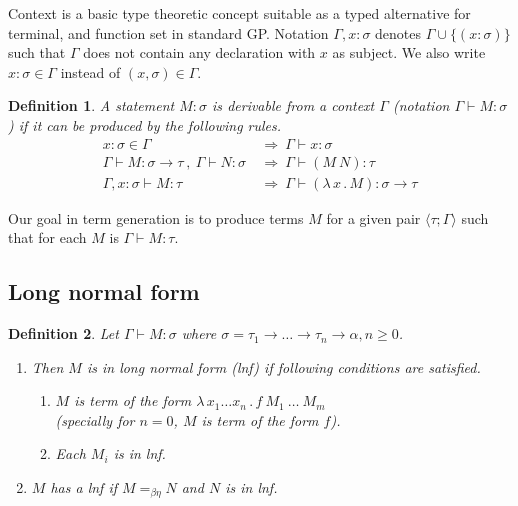 \documentclass{sig-alternate}
\newtheorem{definition}{Definition}
\newcommand{\tur}[3]{#1\vdash{}#2 \colon #3}
\newcommand{\turst}[3]{$#1\vdash{}#2:#3$\xspace}
\newcommand{\GMS}{\turst{\Gamma}{M}{\sigma}}
\newcommand{\then}{\Rightarrow\xspace}
\newcommand{\lamb}[2]{( \lambda \, #1 \, . \, #2 )}
\newcommand{\lam}[2]{\lambda \, #1 \, . \, #2}
\newcommand{\lnf}{\textit{lnf}\xspace}
\newcommand{\ar}{\rightarrow\xspace}
\newcommand{\ul}[2]{\langle #1 ; #2 \rangle}
\begin{document}
Context is a basic type theoretic concept suitable as a typed alternative
for terminal, and function set in standard GP. 
Notation $\Gamma,x:\sigma $ denotes $ \Gamma\cup\{(x:\sigma)\}$ 
such that $\Gamma$ does not contain any declaration with $x$ as subject.
We also write $x:\sigma \in \Gamma$ instead of $(x,\sigma) \in \Gamma$.

\begin{definition}
A statement $M\colon\sigma$ is \textit{derivable from}
a context $\Gamma$ (notation 
\mbox{$\Gamma\vdash{}M\colon\sigma$}) 
if it can be produced by the following rules.
\begin{align*}
x : \sigma \in \Gamma &~\then~ \tur{\Gamma}{x}{\sigma}\\
\tur{\Gamma}{M}{\sigma \ar \tau}~,~\tur{\Gamma}{N}{\sigma} 
&~\then~ \tur{\Gamma}{(M~N)}{\tau}\\  
\tur{\Gamma,x:\sigma}{M}{\tau}
&~\then~ \tur{\Gamma}{\lamb{x}{M}}{\sigma \ar \tau} 
\end{align*}
\end{definition}

Our goal in term generation is to produce terms $M$
for a given pair $\ul{\tau}{\Gamma}$
such that for each $M$ is $\tur{\Gamma}{M}{\tau}$.

\subsection{Long normal form}
\label{lnf}


\begin{definition}
Let \GMS where 
$\sigma = \tau_1 \ar \dots \ar \tau_n \ar \alpha, n \geq 0$.
	\begin{enumerate}
	  \item	
		Then $M$ is in \textit{long normal form} (\lnf) if following 
		conditions are satisfied.
		\begin{enumerate}
		 \item $M$ is term of the form $\lam{x_1 \dots x_n}{f~M_1~\dots~M_m}$\\
		  (specially for $n = 0$, $M$ is term of the form $f$).
		 \item Each $M_i$ is in \lnf.
		\end{enumerate}	
	  \item 
	    $M$ has a \lnf if $M =_{\beta\eta} N$ and $N$ is in \lnf.
	\end{enumerate}
\end{definition}~
\end{document}
